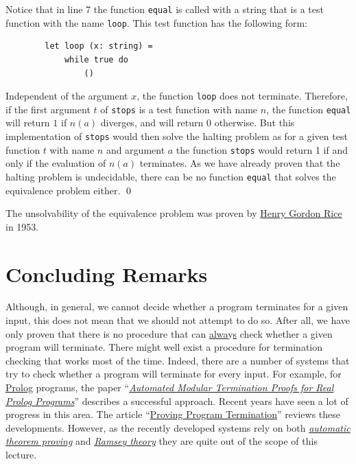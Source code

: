 Notice that in line 7 the function \texttt{equal} is called with a string that is a test function with the
name \texttt{loop}.  This test function has the following form:
\begin{verbatim}
        let loop (x: string) =
            while true do
                ()
\end{verbatim}
Independent of the argument $x$, the function \texttt{loop} does not terminate.
Therefore, if the first argument $t$ of \texttt{stops} is a test function with name $n$, 
the function \texttt{equal} will return $1$ if $n(a)$ diverges, and will return $0$ otherwise.
But this implementation of \texttt{stops} would then solve the halting problem as
for a given test function $t$ with name $n$ and argument $a$ the function \texttt{stops} would
return 1 if and only if the evaluation of $n(a)$ terminates.  As we have already proven that the
halting problem is undecidable, there can be no function \texttt{equal} that solves the equivalence
problem either.
\qed

\remarkEng
The unsolvability of the equivalence problem was proven by \href{http://en.wikipedia.org/wiki/Henry_Gordon_Rice}{Henry Gordon Rice} \cite{rice:1953} in 1953.
\eox
\pagebreak

\section{Concluding Remarks}
Although, in general, we cannot decide whether a program terminates for a given input, this does not mean
that we should not attempt to do so.  After all, we have only proven that there is no procedure that
can \underline{alwa}y\underline{s} check whether a given program will terminate.  There might well exist a
procedure for termination checking that works most of the time.  Indeed, there are a number of
systems that try to check whether a program will terminate for every input.  For example, for
\href{https://en.wikipedia.org/wiki/Prolog}{Prolog}
programs, the paper
``\href{http://link.springer.com/chapter/10.1007%2F3-540-61739-6_44}{\emph{Automated Modular Termination Proofs for Real Prolog Programs}}''
\cite{mueller:1996} describes a successful approach.  Recent years have seen a lot of progress in
this area.  The article 
``\href{http://dl.acm.org/citation.cfm?id=1941509}{{Proving Program Termination}}''
\cite{cook:2011} reviews these developments.  However, as the recently developed systems rely on both
\href{http://en.wikipedia.org/wiki/Automated_theorem_proving}{\emph{automatic theorem proving}} and
\href{http://en.wikipedia.org/wiki/Ramsey_theory}{\emph{Ramsey theory}} they are quite out of the
scope of this lecture.

